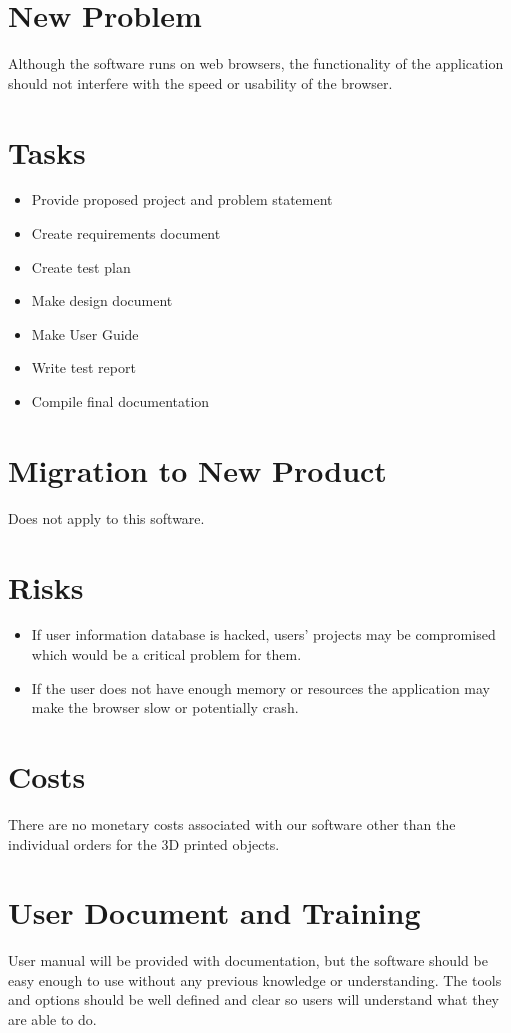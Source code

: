 \documentclass{report}
\begin{document}
\section{New Problem}
Although the software runs on web browsers, the functionality of the application should not interfere with the speed or usability of the browser.
\section{Tasks}
\begin{itemize}
\item Provide proposed project and problem statement
\item Create requirements document
\item Create test plan
\item Make design document
\item Make User Guide
\item Write test report
\item Compile final documentation
\end{itemize}
\section{Migration to New Product}
Does not apply to this software.

\section{Risks}
\begin{itemize}
\item If user information database is hacked, users' projects may be compromised which would be a critical problem for them.
\item If the user does not have enough memory or resources the application may make the browser slow or potentially crash.
\end{itemize}

\section{Costs}
There are no monetary costs associated with our software other than the individual orders for the 3D printed objects.
\section{User Document and Training}
User manual will be provided with documentation, but the software should be easy enough to use without any previous knowledge or understanding.  The tools and options should be well defined and clear so users will understand what they are able to do.
\end{document}
